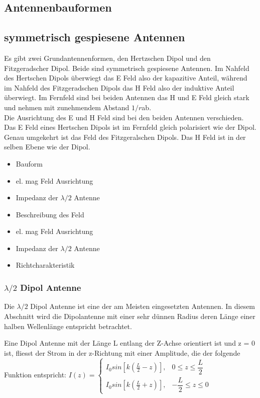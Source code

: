 \subsection{Antennenbauformen}
\subsection{symmetrisch gespiesene Antennen}


Es gibt zwei Grundantennenformen, den Hertzschen Dipol und den Fitzgeradscher Dipol. Beide sind symmetrisch gespiesene Antennen. Im Nahfeld des Hertschen Dipols überwiegt das E Feld also der kapazitive Anteil, während im Nahfeld des Fitzgeradschen Dipols das H Feld also der induktive Anteil überwiegt. Im Fernfeld sind bei beiden Antennen das H und E Feld gleich stark und nehmen mit zunehmendem Abstand $1/r$ab. \\
Die Ausrichtung des E und H Feld sind bei den beiden Antennen verschieden. \\
Das E Feld eines Hertschen Dipols ist im Fernfeld gleich polarisiert wie der Dipol. \\
Genau umgekehrt ist das Feld des Fitzgeralschen Dipols. Das H Feld ist in der selben Ebene wie der Dipol. 

\begin{itemize}
\item Bauform
\item el. mag Feld Ausrichtung
\item Impedanz der $\lambda /2 $ Antenne
\item Beschreibung des Feld
\item el. mag Feld Ausrichtung
\item Impedanz der $\lambda /2 $ Antenne
\item Richtcharakteristik
\end{itemize}
\subsubsection{$\lambda /2 $ Dipol Antenne}
Die $\lambda /2 $ Dipol Antenne ist eine der am Meisten eingesetzten Antennen. In diesem Abschnitt wird die Dipolantenne mit einer sehr dünnen Radius  deren Länge einer halben Wellenlänge entspricht betrachtet. 

Eine Dipol Antenne mit der Länge L entlang der Z-Achse orientiert ist und z = 0 ist, fliesst der Strom in der z-Richtung mit einer Amplitude, die der folgende Funktion entspricht:
$I(z)=\begin{cases}I_{0}sin[k(\frac{L}{2}-z)],& 0\le z \le \dfrac{L}{2} \\ I_{0}sin[k(\frac{L}{2}+z)], & -\dfrac{L}{2} \le z \le 0 \end{cases}$

